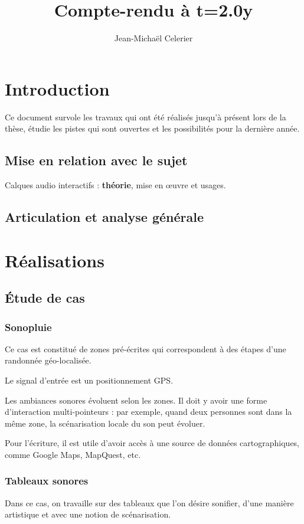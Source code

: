 \documentclass[french,a4paper,openany,12pt]{book}
\title{Compte-rendu à t=2.0y}
\author{Jean-Michaël Celerier}
\begin{document}
\maketitle

\tableofcontents

\chapter{Introduction}
Ce document survole les travaux qui ont été réalisés jusqu'à présent 
lors de la thèse, étudie les pistes qui sont ouvertes et les possibilités 
pour la dernière année.

\section{Mise en relation avec le sujet}
Calques audio interactifs : \textbf{théorie}, mise en œuvre et usages.

\section{Articulation et analyse générale}
\chapter{Réalisations}

\section{Étude de cas}
\subsection{Sonopluie}
Ce cas est constitué de zones pré-écrites qui correspondent à des 
étapes d'une randonnée géo-localisée.

Le signal d'entrée est un positionnement GPS.

Les ambiances sonores évoluent selon les zones.
Il doit y avoir une forme d'interaction multi-pointeurs : 
par exemple, quand deux personnes sont dans la même zone, la scénarisation 
locale du son peut évoluer.

Pour l'écriture, il est utile d'avoir accès à une source de données cartographiques, 
comme Google Maps, MapQuest, etc.

\subsection{Tableaux sonores}
Dans ce cas, on travaille sur des tableaux que l'on désire sonifier, d'une manière 
artistique et avec une notion de scénarisation.
\end{document}

